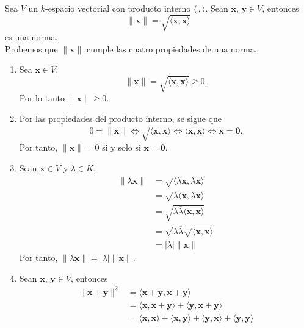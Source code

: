 \begin{example}
    Sea $V$ un $k$-espacio vectorial con producto interno $\langle \, , \rangle$. Sean $\mathbf{x}$, $\mathbf{y} \in V$, entonces
    $$\| \mathbf{x} \| = \sqrt{\langle \mathbf{x}, \mathbf{x} \rangle}$$
    es una norma. \\
    \demostracion Probemos que $\| \mathbf{x} \|$ cumple las cuatro propiedades de una norma.
    \begin{enumerate}[label=\roman*.]
        \item Sea $\mathbf{x} \in V$,
        $$\| \mathbf{x} \| = \sqrt{\langle \mathbf{x}, \mathbf{x} \rangle} \geq 0.$$
        Por lo tanto $\| \mathbf{x} \| \geq 0$.
        \item Por las propiedades del producto interno, se sigue que
        $$0 = \| \mathbf{x} \| \Longleftrightarrow \sqrt{\langle \mathbf{x}, \mathbf{x} \rangle} \Longleftrightarrow \langle \mathbf{x}, \mathbf{x} \rangle \Longleftrightarrow \mathbf{x} = \mathbf{0}.$$
        Por tanto, $\| \mathbf{x} \| = 0$ si y solo si $\mathbf{x} = \mathbf{0}$.
        \item Sean $\mathbf{x} \in V$ y $\lambda \in K$,
        \begin{align*}
            \| \lambda \mathbf{x} \| & = \sqrt{\langle \lambda \mathbf{x}, \lambda \mathbf{x} \rangle} \\
            & = \sqrt{\lambda \langle \mathbf{x}, \lambda \mathbf{x} \rangle} \\
            & = \sqrt{\lambda \overline{\lambda} \langle \mathbf{x}, \mathbf{x} \rangle} \\
            & = \sqrt{\lambda \overline{\lambda}} \sqrt{\langle \mathbf{x}, \mathbf{x} \rangle} \\
            & = |\lambda| \| \mathbf{x} \|
        \end{align*}
        Por tanto, $\| \lambda \mathbf{x} \| = |\lambda| \| \mathbf{x} \|$.
        \item Sean $\mathbf{x}$, $\mathbf{y} \in V$, entonces
        \begin{align*}
            \| \mathbf{x} + \mathbf{y} \|^2 & = \langle \mathbf{x} + \mathbf{y}, \mathbf{x} + \mathbf{y} \rangle \\
            & = \langle \mathbf{x}, \mathbf{x} + \mathbf{y} \rangle + \langle \mathbf{y}, \mathbf{x} + \mathbf{y} \rangle \\
            & = \langle \mathbf{x}, \mathbf{x} \rangle + \langle \mathbf{x}, \mathbf{y} \rangle + \langle \mathbf{y}, \mathbf{x} \rangle + \langle \mathbf{y}, \mathbf{y} \rangle \\

\end{align*}
\end{enumerate}
\end{example}
